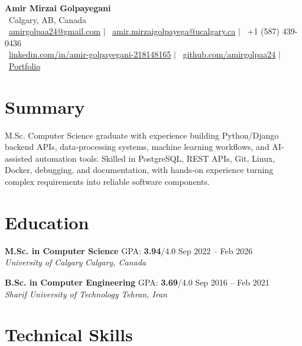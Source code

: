 \documentclass[a4paper,10pt]{article}
\newcommand{\resumeEducationSubheading}[5]{
    \textbf{#1} \hfill #2 \hfill #3 \\
    \textit{#4} \hfill \textit{#5}
}
\begin{document}

\begin{center}
    {\LARGE \textbf{Amir Mirzai Golpayegani}} \\[0.25em]
    \faMapMarker*~Calgary, AB, Canada \\[0.25em]
    \faEnvelope~\href{mailto:amirgolpaa24@gmail.com}{amirgolpaa24@gmail.com}
    $|$
    \faEnvelope~\href{mailto:amir.mirzaigolpayega@ucalgary.ca}{amir.mirzaigolpayega@ucalgary.ca}
    $|$
    \faPhone*~+1 (587) 439-0436 \\[0.25em]
    \faLinkedin~\href{https://linkedin.com/in/amir-golpayegani-218148165}{linkedin.com/in/amir-golpayegani-218148165}
    $|$
    \faGithub~\href{https://github.com/amirgolpaa24}{github.com/amirgolpaa24}
    $|$
    \faGlobe~\href{https://amir-portfolio-navy.vercel.app/}{Portfolio}
\end{center}


\section*{Summary}

M.Sc. Computer Science graduate with experience building Python/Django backend APIs, data-processing systems, machine learning workflows, and AI-assisted automation tools. Skilled in PostgreSQL, REST APIs, Git, Linux, Docker, debugging, and documentation, with hands-on experience turning complex requirements into reliable software components.


\section*{Education}

\resumeEducationSubheading
{M.Sc. in Computer Science}
{GPA: \textbf{3.94}/4.0}
{Sep 2022 -- Feb 2026}
{University of Calgary}
{Calgary, Canada}

\vspace{0.35em}

\resumeEducationSubheading
{B.Sc. in Computer Engineering}
{GPA: \textbf{3.69}/4.0}
{Sep 2016 -- Feb 2021}
{Sharif University of Technology}
{Tehran, Iran}


\section*{Technical Skills}
\end{document}
